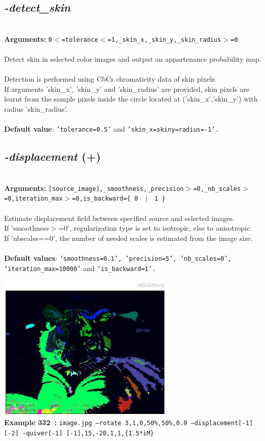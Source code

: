 \documentclass[a4paper,11pt,twoside]{book}
\begin{document}
\subsection{\emph{-detect\_skin} }\vspace*{-0.5em}
~\\\textbf{Arguments: } 
{\small \texttt{0$<$=tolerance$<$=1,\_skin\_x,\_skin\_y,\_skin\_radius$>$=0}}\\~\\
Detect skin in selected color images and output an appartenance probability map.
~\\Detection is performed using CbCr chromaticity data of skin pixels.
~\\If arguments 'skin\_x', 'skin\_y' and 'skin\_radius' are provided, skin pixels are learnt
from the sample pixels inside the circle located at ('skin\_x','skin\_y') with radius 'skin\_radius'.
~\\~\\\textbf{Default value}: {\small \texttt{'tolerance=0.5'} and \texttt{'skin\_x=skiny=radius=-1'.}}


\subsection{\emph{-displacement} (+)}\vspace*{-0.5em}
~\\\textbf{Arguments: } 
{\small \texttt{[source\_image],\_smoothness,\_precision$>$=0,\_nb\_scales$>$=0,iteration\_max$>$=0,is\_backward=\{ 0 ~$|$~ 1 \}}}\\~\\
Estimate displacement field between specified source and selected images.
~\\If 'smoothness$>$=0', regularization type is set to isotropic, else to anisotropic.
~\\If 'nbscales==0', the number of needed scales is estimated from the image size.
~\\~\\\textbf{Default values}: {\small \texttt{'smoothness=0.1', 'precision=5', 'nb\_scales=0', 'iteration\_max=10000'} and \texttt{'is\_backward=1'.}}
\begin{center}\includegraphics[keepaspectratio=true,height=7cm,width=\textwidth]{img/gmic_def332.jpg}\\
{\footnotesize \textbf{Example 332~:} \texttt{image.jpg --rotate 3,1,0,50\%,50\%,0.9 --displacement[-1] [-2] -quiver[-1] [-1],15,-20,1,1,\{1.5*iM\}}}
\end{center}
\end{document}
